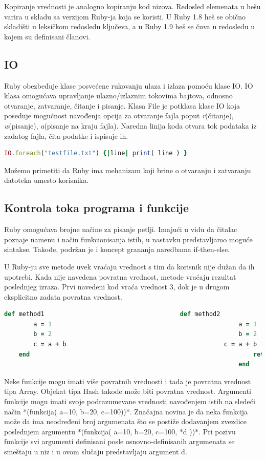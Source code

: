 \documentclass[a4paper]{article}
\begin{document}
Kopiranje vrednosti je analogno kopiranju kod nizova. Redosled elemenata u hešu varira u skladu sa verzijom Ruby-ja koja se koristi. U Ruby 1.8 heš se obično skladišti u leksičkom redosledu ključeva, a u Ruby 1.9 heš se čuva u redosledu u kojem su definisani članovi.

\subsection{IO}
Ruby obezbeđuje klase posvećene rukovanju ulaza i izlaza pomoću klase IO. IO klasa omogućava upravljanje ulazno/izlaznim tokovima bajtova, odnosno otvaranje, zatvaranje, čitanje i pisanje. Klasa File je potklasa klase IO koja poseduje mogućnost navođenja opcija za otvaranje fajla poput \emph{r}(čitanje), \emph{w}(pisanje), \emph{a}(pisanje na kraju fajla). Naredna linija koda otvara tok podataka iz zadatog fajla, čita podatke i ispisuje ih.
\begin{lstlisting}[language=Ruby]
	 IO.foreach("testfile.txt") {|line| print( line ) }
\end{lstlisting}\vspace*{-15pt}

Možemo primetiti da Ruby ima mehanizam koji brine o otvaranju i zatvaranju datoteka umesto korisnika. 

\subsection{Kontrola toka programa i funkcije}
Ruby omogućava brojne načine za pisanje petlji. Imajući u vidu da čitalac poznaje namenu i način funkcionisanja istih, u nastavku predstavljamo moguće sintakse. Takođe, podržan je i koncept grananja naredbama if-then-else.


U Ruby-ju sve metode uvek vraćaju vrednost s tim da korisnik nije dužan da ih upotrebi. Kada nije navedena povratna vrednost, metode vraćaju rezultat poslednjeg izraza. Prvi navedeni kod vraća vrednost 3, dok je u drugom eksplicitno zadata povratna vrednost.

\begin{lstlisting}[language=Ruby]
	def method1 									def method2
		a = 1													a = 1
		b = 2													b = 2
		c = a + b											c = a + b
	end 															return b
																end
\end{lstlisting}\vspace*{-15pt}

Neke funkcije mogu imati više povratnih vrednosti i tada je povratna vrednost tipa Array. Objekat tipa Hash takođe može biti povratna vrednost. Argumenti funkcije mogu imati svoje podrazumevane vrednosti navođenjem istih na sledeći način *(funkcija( a=10, b=20, c=100))*. Značajna novina je da neka funkcija može da ima neodređeni broj argumenata što se postiže dodavanjem zvezdice poslednjem argumentu *(funkcija( a=10, b=20, c=100, *d ))*. Pri pozivu funkcije svi argumenti definisani posle osnovno-definisanih argumenata se smeštaju u niz i u ovom slučaju predstavljaju argument d.
\end{document}

